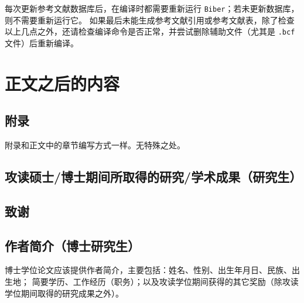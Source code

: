 每次更新参考文献数据库后，在编译时都需要重新运行 \verb|Biber|；若未更新数据库，则不需要重新运行它。
如果最后未能生成参考文献引用或参考文献表，除了检查以上几点之外，还请检查编译命令是否正常，并尝试删除辅助文件（尤其是 \verb|.bcf| 文件）后重新编译。

\section{正文之后的内容}
\subsection{附录}
附录和正文中的章节编写方式一样。无特殊之处。
\subsection{攻读硕士\slash 博士期间所取得的研究\slash 学术成果（研究生）}
\subsection{致谢}
\subsection{作者简介（博士研究生）}
博士学位论文应该提供作者简介，主要包括：姓名、性别、出生年月日、民族、出生地；
简要学历、工作经历（职务）；以及攻读学位期间获得的其它奖励（除攻读学位期间取得的研究成果之外）。
